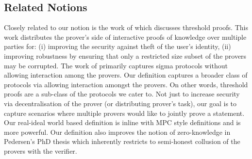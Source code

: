 \subsection{Related Notions}
Closely related to our notion is the work of \cite{EfficientTZ} which discusses threshold proofs. This work distributes the prover's side of interactive proofs of knowledge over multiple parties for: (i) improving the security against theft of the user's identity, (ii) improving robustness by ensuring that only a restricted size subset of the provers may be corrupted. The work of \cite{EfficientTZ} primarily captures sigma protocols without allowing interaction among the provers. Our definition captures a broader class of protocols via allowing interaction amongst the provers.  On other words, threshold proofs are a sub-class of the protocols we cater to. Not just to increase security via decentralisation of the prover (or distributing prover's task), our goal is to capture scenarios where multiple provers would like to jointly prove a statement.  Our real-ideal world based definition is inline with MPC style definitions and is more powerful. Our definition also improves the notion of zero-knowledge in Pedersen's PhD thesis \cite{Ped92} which inherently restricts to semi-honest collusion of the provers with the verifier.



